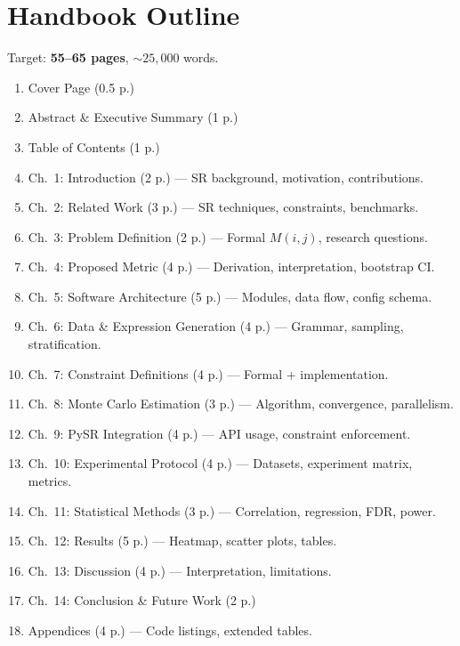 \documentclass[11pt,a4paper]{article}
\begin{document}
\section{Handbook Outline}
\label{sec:handbook}

Target: \textbf{55--65 pages}, ${\sim}25{,}000$ words.

\begin{enumerate}
  \item Cover Page (0.5 p.)
  \item Abstract \& Executive Summary (1 p.)
  \item Table of Contents (1 p.)
  \item Ch.\ 1: Introduction (2 p.) --- SR background, motivation, contributions.
  \item Ch.\ 2: Related Work (3 p.) --- SR techniques, constraints, benchmarks.
  \item Ch.\ 3: Problem Definition (2 p.) --- Formal $M(i,j)$, research questions.
  \item Ch.\ 4: Proposed Metric (4 p.) --- Derivation, interpretation, bootstrap CI.
  \item Ch.\ 5: Software Architecture (5 p.) --- Modules, data flow, config schema.
  \item Ch.\ 6: Data \& Expression Generation (4 p.) --- Grammar, sampling, stratification.
  \item Ch.\ 7: Constraint Definitions (4 p.) --- Formal + implementation.
  \item Ch.\ 8: Monte Carlo Estimation (3 p.) --- Algorithm, convergence, parallelism.
  \item Ch.\ 9: PySR Integration (4 p.) --- API usage, constraint enforcement.
  \item Ch.\ 10: Experimental Protocol (4 p.) --- Datasets, experiment matrix, metrics.
  \item Ch.\ 11: Statistical Methods (3 p.) --- Correlation, regression, FDR, power.
  \item Ch.\ 12: Results (5 p.) --- Heatmap, scatter plots, tables.
  \item Ch.\ 13: Discussion (4 p.) --- Interpretation, limitations.
  \item Ch.\ 14: Conclusion \& Future Work (2 p.)
  \item Appendices (4 p.) --- Code listings, extended tables.
\end{enumerate}

\end{document}
